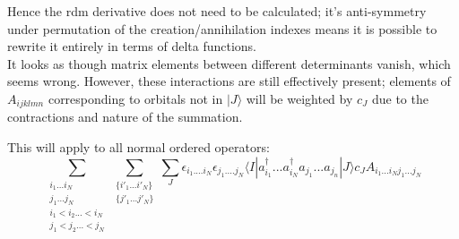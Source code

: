 \documentclass[12pt]{article}
\begin{document}
\noindent Hence the rdm derivative does not need to be calculated; it's anti-symmetry under
permutation of the creation/annihilation indexes means it is possible to rewrite it
 entirely in terms of delta functions.\\

\noindent It looks as though matrix elements between different determinants vanish, which seems wrong. However,
these interactions are still effectively present; elements of $A_{ijklmn}$ corresponding to orbitals not in $|J\rangle$ will 
be weighted by $c_{J}$ due to the contractions and nature of the summation.

\noindent This will apply to all normal ordered operators:
\begin{equation}
\sum_{\substack{ i_{1}...i_{N} \\ j_{1}...j_{N} \\ i_{1}<i_{2}...<i_{N} \\ j_{1}<j_{2}...<j_{N} }}
\sum_{\substack{ \{i'_{1}...i'_{N}\} \\ \{j'_{1}...j'_{N}\} }}
\sum_{J}
\epsilon_{i_{1}....i_{N}}
\epsilon_{j_{1}....j_{N}}
\langle I | a^{\dagger}_{i_{1}}...a^{\dagger}_{i_{N}} a_{j_{1}}...a_{j_{n}}| J \rangle c_{J}   A_{i_{1}...i_{N}j_{1}...j_{N}}
\end{equation}
\end{document}
